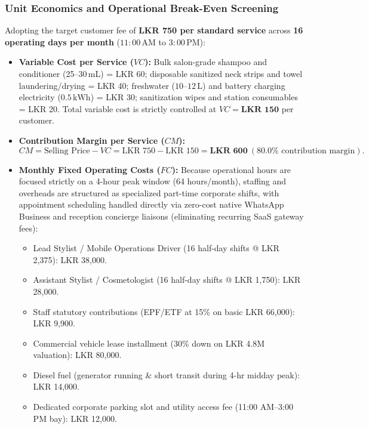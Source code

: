 \subsubsection{Unit Economics and Operational Break-Even Screening}
Adopting the target customer fee of \textbf{LKR 750 per standard service} across \textbf{16 operating days per month} ($11{:}00\,\text{AM}$ to $3{:}00\,\text{PM}$):
\begin{itemize}[leftmargin=1.5em, itemsep=0.15em]
    \item \textbf{Variable Cost per Service ($VC$):} Bulk salon-grade shampoo and conditioner (25--30\,mL) = LKR 60; disposable sanitized neck strips and towel laundering/drying = LKR 40; freshwater ($10\text{--}12\,\text{L}$) and battery charging electricity ($0.5\,\text{kWh}$) = LKR 30; sanitization wipes and station consumables = LKR 20. Total variable cost is strictly controlled at $VC = \mathbf{\text{LKR } 150}$ per customer.
    \item \textbf{Contribution Margin per Service ($CM$):}
    \begin{equation}
        CM = \text{Selling Price} - VC = \text{LKR } 750 - \text{LKR } 150 = \mathbf{\text{LKR } 600} \ (80.0\%\text{ contribution margin}).
    \end{equation}
    \item \textbf{Monthly Fixed Operating Costs ($FC$):} Because operational hours are focused strictly on a 4-hour peak window (64 hours/month), staffing and overheads are structured as specialized part-time corporate shifts, with appointment scheduling handled directly via zero-cost native WhatsApp Business and reception concierge liaisons (eliminating recurring SaaS gateway fees):
    \begin{itemize}[leftmargin=1.2em, itemsep=0.1em]
        \item Lead Stylist / Mobile Operations Driver (16 half-day shifts @ LKR 2,375): LKR 38,000.
        \item Assistant Stylist / Cosmetologist (16 half-day shifts @ LKR 1,750): LKR 28,000.
        \item Staff statutory contributions (EPF/ETF at 15\% on basic LKR 66,000): LKR 9,900.
        \item Commercial vehicle lease installment (30\% down on LKR 4.8M valuation): LKR 80,000.
        \item Diesel fuel (generator running \& short transit during 4-hr midday peak): LKR 14,000.
        \item Dedicated corporate parking slot and utility access fee (11:00 AM--3:00 PM bay): LKR 12,000.

\end{itemize}
\end{itemize}
